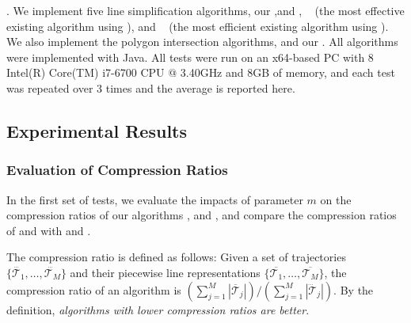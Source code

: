 .
We implement five line simplification algorithms, \ie our \cist ,\cista and \cisto, \dps~\cite{Meratnia:Spatiotemporal} (the most effective existing \lsa algorithm using \sed), and \squishe~\cite{Muckell:Compression} (the most efficient existing \lsa algorithm using \sed).
We also implement the polygon intersection algorithms, \cpia and our \rpia.
All algorithms were implemented with Java.
All tests were run on an {x64-based  PC with 8 Intel(R) Core(TM) i7-6700 CPU @ 3.40GHz and 8GB of memory, and each test was repeated
over 3 times and the average is reported here}.





\subsection{Experimental Results}


\subsubsection{Evaluation of Compression Ratios}


In the first set of tests, we evaluate the impacts of parameter $m$ on the
compression ratios of our algorithms \cist, \cista and \cisto, and compare the compression ratios of \cist and \cista with \dps and \squishe.

The compression ratio is defined as follows: Given a set of trajectories $\{\dddot{\mathcal{T}_1}, \ldots, \dddot{\mathcal{T}_M}\}$ and their piecewise line representations $\{\overline{\mathcal{T}_1}, \ldots, \overline{\mathcal{T}_M}\}$, the compression ratio of an algorithm is $(\sum_{j=1}^{M} |\overline{\mathcal{T}}_j |)/(\sum_{j=1}^{M} |\dddot{\mathcal{T}}_j |)$.
By the definition, \emph{algorithms with lower compression ratios are better}.







